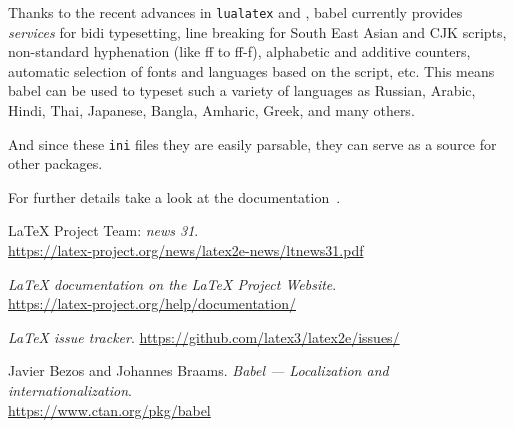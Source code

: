 \documentclass{ltnews}
\begin{document}
Thanks to the recent advances in \texttt{lualatex} and
, babel currently provides \emph{services} for bidi
typesetting, line breaking for South East Asian and CJK scripts,
non-standard hyphenation (like ff to ff-f), alphabetic and additive
counters, automatic selection of fonts and languages based on the
script, etc. This means babel can be used to typeset such a variety of
languages as Russian, Arabic, Hindi, Thai, Japanese, Bangla, Amharic,
Greek, and many others.

And since these \texttt{ini} files they are easily parsable, they can
serve as a source for other packages.

For further details take a look at the 
documentation~\cite{32:babel}.


\begin{thebibliography}{9}

\fontsize{9.3}{11.3}\selectfont

 \LaTeX{} Project Team:
  \emph{\LaTeXe{} news 31}.\\
  \url{https://latex-project.org/news/latex2e-news/ltnews31.pdf}

  \emph{\LaTeX{} documentation on the \LaTeX{} Project Website}.\\
  \url{https://latex-project.org/help/documentation/}

  \emph{\LaTeX{} issue tracker}.
  \url{https://github.com/latex3/latex2e/issues/}

  Javier Bezos and Johannes Braams.
  \emph{Babel --- Localization and internationalization}.\\
  \url{https://www.ctan.org/pkg/babel}

\end{thebibliography}
\end{document}
